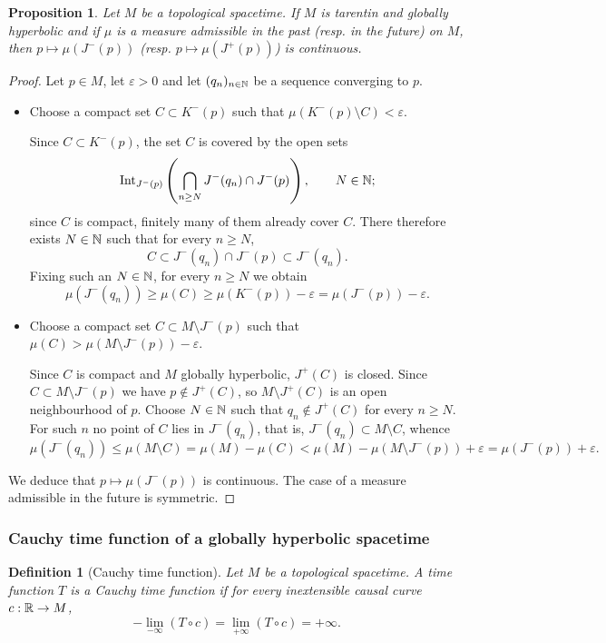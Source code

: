 \documentclass[a4paper,twoside]{article}
\newtheorem{prop}[lem]{Proposition}
\newtheorem{defi}[lem]{Definition}
\begin{document}
\begin{prop}\label{prop:cont_ext_cont}
Let $M$ be a topological spacetime. If $M$ is
tarentin and globally hyperbolic and if $\mu$ is a measure admissible in the past (resp. in the
future) on $M$, then $p\mapsto \mu(J^-(p))$ (resp. $p\mapsto \mu(J^+(p))$) is continuous.
\end{prop}
\begin{proof}Let $p\in M$, let $\varepsilon>0$ and let $(q_n)_{n\in \mathbb{N}}$ be a sequence converging to
$p$.
\begin{itemize}
\item  Choose a compact set $C\subset K^-(p)$ such that
$\mu(K^-(p)\setminus C)<\varepsilon$.

Since $C\subset K^-(p)$, the set $C$ is covered by the open sets $$\mathrm{Int}_{J^-(p)}\left(\bigcap_{n\geq N}J^-(q_n)\cap J^-(p)\right),\quad \quad N\in \mathbb{N};$$
since $C$ is compact, finitely many of them already cover $C$. There therefore exists
$N\in \mathbb{N}$ such that for every
$n\geq N$, $$C\subset J^-(q_n)\cap J^-(p) \subset J^-(q_n). $$
Fixing such an $N\in\mathbb{N}$, for every $n\geq N$ we obtain
$$\mu(J^-(q_n))  \geq \mu(C)\geq \mu(K^-(p))-\varepsilon=\mu(J^-(p))-\varepsilon.$$

\item Choose a compact set $C\subset M\setminus J^-(p)$ such that
$\mu(C)>\mu(M\setminus J^-(p))-\varepsilon$.

Since $C$ is compact and $M$ globally hyperbolic, $J^+(C)$ is closed.
Since $C\subset M\setminus J^-(p)$ we have $p\notin J^+(C)$, so
$M\setminus J^+(C)$ is an open neighbourhood of $p$. Choose $N\in \mathbb{N}$ such that $q_n\notin J^+(C)$ for every $n\geq N$.
For such $n$ no point of $C$ lies in $J^-(q_n)$, that is, $J^-(q_n)\subset M\setminus C$, whence
$$\mu(J^-(q_n))\leq \mu(M\setminus C)= \mu(M)-\mu(C)< \mu(M)-\mu(M\setminus J^-(p))+\varepsilon = \mu(J^-(p))+\varepsilon.$$
\end{itemize}
We deduce that $p\mapsto \mu(J^-(p))$ is continuous. The case of a measure admissible in the future is symmetric.
\end{proof}

\subsubsection{Cauchy time function of a globally hyperbolic spacetime}

\begin{defi}[Cauchy time function]\label{def:cauchy_time_function} Let $M$ be a topological spacetime. A time function $T$ is a Cauchy time function
if for every inextensible causal curve $c:\mathbb R\rightarrow M$,
$$-\lim_{-\infty} (T\circ c) = \lim_{+\infty}(T\circ c) = +\infty.$$
\end{defi}
\end{document}
